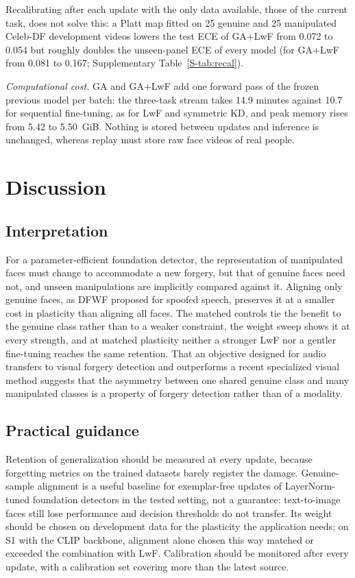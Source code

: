 \documentclass[journal]{IEEEtran}
\begin{document}
Recalibrating after each update with the only data available, those of the current task, does not solve this: a Platt map fitted on 25 genuine and 25 manipulated Celeb-DF development videos lowers the test ECE of GA+LwF from 0.072 to 0.054 but roughly doubles the unseen-panel ECE of every model (for GA+LwF from 0.081 to 0.167; Supplementary Table~\ref{S-tab:recal}).

\textit{Computational cost.} GA and GA+LwF add one forward pass of the frozen previous model per batch: the three-task stream takes 14.9 minutes against 10.7 for sequential fine-tuning, as for LwF and symmetric KD, and peak memory rises from 5.42 to 5.50~GiB. Nothing is stored between updates and inference is unchanged, whereas replay must store raw face videos of real people.

\section{Discussion}
\label{sec:discussion}

\subsection{Interpretation}
For a parameter-efficient foundation detector, the representation of manipulated faces must change to accommodate a new forgery, but that of genuine faces need not, and unseen manipulations are implicitly compared against it. Aligning only genuine faces, as DFWF proposed for spoofed speech, preserves it at a smaller cost in plasticity than aligning all faces. The matched controls tie the benefit to the genuine class rather than to a weaker constraint, the weight sweep shows it at every strength, and at matched plasticity neither a stronger LwF nor a gentler fine-tuning reaches the same retention. That an objective designed for audio transfers to visual forgery detection and outperforms a recent specialized visual method suggests that the asymmetry between one shared genuine class and many manipulated classes is a property of forgery detection rather than of a modality.

\subsection{Practical guidance}
Retention of generalization should be measured at every update, because forgetting metrics on the trained datasets barely register the damage. Genuine-sample alignment is a useful baseline for exemplar-free updates of LayerNorm-tuned foundation detectors in the tested setting, not a guarantee: text-to-image faces still lose performance and decision thresholds do not transfer. Its weight should be chosen on development data for the plasticity the application needs; on S1 with the CLIP backbone, alignment alone chosen this way matched or exceeded the combination with LwF. Calibration should be monitored after every update, with a calibration set covering more than the latest source.
\end{document}
